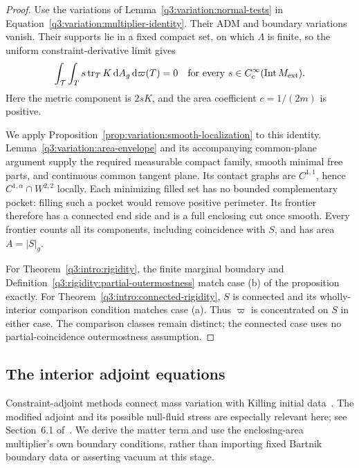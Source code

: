 \begin{proof}
Use the variations of Lemma~\ref{q3:variation:normal-tests} in
Equation~\eqref{q3:variation:multiplier-identity}. Their ADM and
boundary variations vanish. Their supports lie in a fixed compact
set, on which $\Lambda$ is finite, so the uniform constraint-derivative
limit gives
\begin{equation}
 \int_{\mathcal T}\int_T s\operatorname{tr}_TK\,\mathrm d A_g\,\mathrm d\varpi(T)=0
 \quad\hbox{for every }s\in C_c^\infty(\operatorname{Int}M_{\mathrm{ext}}).
 \label{q3:variation:aggregate-trace}
\end{equation}
Here the metric component is $2sK$, and the area coefficient
$c=1/(2m)$ is positive.

We apply Proposition~\ref{prop:variation:smooth-localization} to this
identity. Lemma~\ref{q3:variation:area-envelope} and its accompanying
common-plane argument supply the required measurable compact family,
smooth minimal free parts, and continuous common tangent plane. Its
contact graphs are $C^{1,1}$, hence $C^{1,\alpha}\cap W^{2,2}$ locally.
Each minimizing filled set has no bounded complementary pocket:
filling such a pocket would remove positive perimeter. Its frontier
therefore has a connected end side and is a full enclosing cut once
smooth. Every frontier counts all its components, including coincidence
with $S$, and has area $A=|S|_g$.

For Theorem~\ref{q3:intro:rigidity}, the finite marginal boundary and
Definition~\ref{q3:rigidity:partial-outermostness} match case
\textup{(b)} of the proposition exactly. For
Theorem~\ref{q3:intro:connected-rigidity}, $S$ is connected and its
wholly-interior comparison condition matches case \textup{(a)}.
Thus $\varpi$ is concentrated on $S$ in either case. The comparison
classes remain distinct; the connected case uses no partial-coincidence
outermostness assumption.
\end{proof}


\subsection{The interior adjoint equations}
\label{q3:variation:interior-subsection}

Constraint-adjoint methods connect mass variation with Killing initial
data~\cite{BeigChrusciel1997KID,HuangLee2024Bartnik}. The modified
adjoint and its possible null-fluid stress are especially relevant
here; see Section~6.1 of~\cite{HuangLee2024Bartnik}. We derive the
matter term and use the enclosing-area multiplier's own boundary
conditions, rather than importing fixed Bartnik boundary data or
asserting vacuum at this stage.


